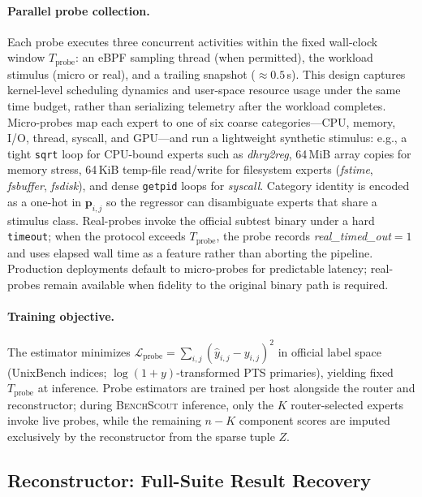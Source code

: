 \documentclass[sigplan,10pt]{acmart}
\newcommand{\ourmethod}{\textsc{BenchScout}\xspace}
\newcommand{\id}[1]{{\itshape #1}}
\begin{document}
\paragraph{Parallel probe collection.}
Each probe executes three concurrent activities within the fixed wall-clock window $T_{\mathrm{probe}}$: an eBPF sampling thread (when permitted), the workload stimulus (micro or real), and a trailing  snapshot (${\approx}0.5$\,s).
This design captures kernel-level scheduling dynamics and user-space resource usage under the same time budget, rather than serializing telemetry after the workload completes.
Micro-probes map each expert to one of six coarse categories---CPU, memory, I/O, thread, syscall, and GPU---and run a lightweight synthetic stimulus: e.g., a tight \texttt{sqrt} loop for CPU-bound experts such as \id{dhry2reg}, 64\,MiB array copies for memory stress, 64\,KiB temp-file read/write for filesystem experts (\id{fstime}, \id{fsbuffer}, \id{fsdisk}), and dense \texttt{getpid} loops for \id{syscall}.
Category identity is encoded as a one-hot in $\mathbf{p}_{i,j}$ so the regressor can disambiguate experts that share a stimulus class.
Real-probes invoke the official subtest binary under a hard \texttt{timeout}; when the protocol exceeds $T_{\mathrm{probe}}$, the probe records \id{real\_timed\_out}${=}1$ and uses elapsed wall time as a feature rather than aborting the pipeline.
Production deployments default to micro-probes for predictable latency; real-probes remain available when fidelity to the original binary path is required.

\paragraph{Training objective.}
The estimator minimizes $\mathcal{L}_{\mathrm{probe}}=\sum_{i,j}(\hat{y}_{i,j}-y_{i,j})^2$ in official label space (UnixBench indices; $\log(1+y)$-transformed PTS primaries), yielding fixed $T_{\mathrm{probe}}$ at inference.
Probe estimators are trained per host alongside the router and reconstructor; during \ourmethod{} inference, only the $K$ router-selected experts invoke live probes, while the remaining $n{-}K$ component scores are imputed exclusively by the reconstructor from the sparse tuple $Z$.


\subsection{Reconstructor: Full-Suite Result Recovery}
\label{subsec:reconstructor}
\end{document}
